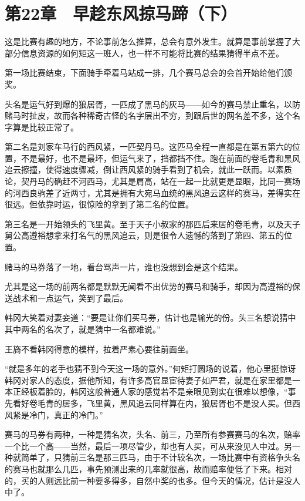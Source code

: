 \section{第22章　早趁东风掠马蹄（下）}

这是比赛有趣的地方，不论事前怎么推算，总会有意外发生。就算是事前掌握了大部分信息资源的如何矩这一班人，也一样不可能将比赛的结果猜得半点不差。 

第一场比赛结束，下面骑手牵着马站成一排，几个赛马总会的会首开始给他们颁奖。 

头名是运气好到爆的狼居胥，一匹成了黑马的灰马——如今的赛马禁止重名，以防赌马时扯皮，故而各种稀奇古怪的名字层出不穷，到跟后世的网名差不多，这个名字算是比较正常了。 

第二名是刘家车马行的西风紧，一匹契丹马。这匹马全程一直都是在第五第六的位置，不是最好，也不是最坏，但运气来了，挡都挡不住。跑在前面的卷毛青和黑风追云擦撞，使得速度骤减，倒让西风紧的骑手看到了机会，就此一跃而。以素质论，契丹马的确赶不河西马，尤其是肩高，站在一起一比就更是显眼，比同一赛场的河西良驹差了近两寸，尤其是拥有大宛马血统的黑风追云这样的赛马，差得实在很远。但依靠时运，很惊险的拿到了第二名的位置。 

第三名是一开始领头的飞里黄。至于天子小叔家的那匹后来居的卷毛青，以及天子舅公高遵裕想拿来打名气的黑风追云，则是很令人遗憾的落到了第四、第五的位置。 

赌马的马券落了一地，看台骂声一片，谁也没想到会是这个结果。 

尤其是这一场的前两名都是默默无闻看不出优势的赛马和骑手，却因为高遵裕的保送战术和一点运气，笑到了最后。 

韩冈大笑着对妻妾道：“要是让你们买马券，估计也是输光的份。头三名想说猜中其中两名的名次了，就是猜中一名都难说。” 

王旖不看韩冈得意的模样，拉着严素心要往前面坐。 

“就是多年的老手也猜不到今天这一场的意外。”何矩打圆场的说着，他心里挺惊讶韩冈对家人的态度，据他所知，有许多高官显宦待妻子如严君，就是在家里都是一本正经板着脸的，韩冈这般普通人家的感觉若不是亲眼见到实在很难以想像，“事先看好卷毛青的居多，飞里黄，黑风追云同样算在内，狼居胥也不是没人买。但西风紧是冷门，真正的冷门。” 

赛马的马券有两种，一种是猜名次，头名、前三，乃至所有参赛赛马的名次，赔率一个比一个高——当然，最后一项尽管少，却也有人买，可从来没见人中过。另一种就简单了，只猜前三名是那三匹马，由于不计较名次，一场比赛中有资格争头名的赛马也就那么几匹，事先预测出来的几率就很高，故而赔率便低了下来。相对的，买的人则远比前一种要多得多，自然中奖的也多。但今天的情况，估计是没人中了。 

